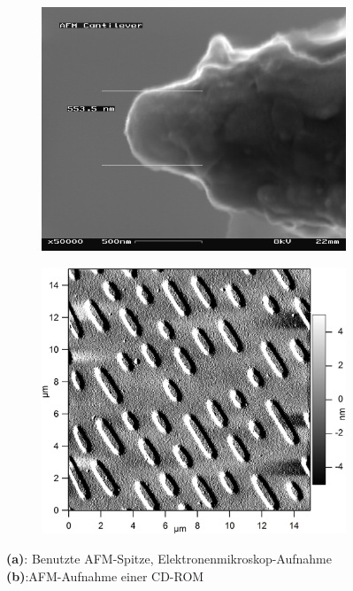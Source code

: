 \documentclass[numbers=noenddot,a4paper,notitlepage,twoside,BCOR15mm]{scrartcl}
\begin{document}
				\begin{figure}[t]
					\centering
					\begin{subfigure}{0.48\textwidth}
						\includegraphics[width=\textwidth]{AFM_(used)_cantilever_in_Scanning_Electron_Microscope,_magnification_50000x.png}
						\caption{}
					\end{subfigure}
					\begin{subfigure}{0.48\textwidth}
						\includegraphics[width=\textwidth]{Afm_cd-rom.png}
						\caption{}
					\end{subfigure}
					\caption{\textbf{(a)}: Benutzte AFM-Spitze, Elektronenmikroskop-Aufnahme \textbf{(b)}:AFM-Aufnahme einer CD-ROM \cite{Wiki:AFM}}
				\end{figure}
\end{document}
